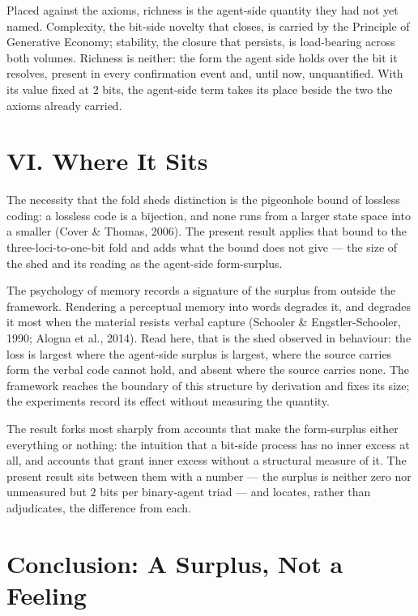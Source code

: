 \documentclass[11pt,oneside]{report}
\theoremstyle{definition}
\theoremstyle{remark}
\begin{document}
Placed against the axioms, richness is the agent-side quantity they had not yet named.
Complexity, the bit-side novelty that closes, is carried by the Principle of Generative Economy;
stability, the closure that persists, is load-bearing across both volumes. Richness is neither:
the form the agent side holds over the bit it resolves, present in every confirmation event and,
until now, unquantified. With its value fixed at \ensuremath{2} bits, the agent-side term takes
its place beside the two the axioms already carried.

\section*{VI. Where It Sits}

The necessity that the fold sheds distinction is the pigeonhole bound of lossless coding: a
lossless code is a bijection, and none runs from a larger state space into a smaller (Cover \&
Thomas, 2006). The present result applies that bound to the three-loci-to-one-bit fold and adds
what the bound does not give --- the size of the shed and its reading as the agent-side
form-surplus.

The psychology of memory records a signature of the surplus from outside the framework.
Rendering a perceptual memory into words degrades it, and degrades it most when the material
resists verbal capture (Schooler \& Engstler-Schooler, 1990; Alogna et al., 2014). Read here,
that is the shed observed in behaviour: the loss is largest where the agent-side surplus is
largest, where the source carries form the verbal code cannot hold, and absent where the source
carries none. The framework reaches the boundary of this structure by derivation and fixes its
size; the experiments record its effect without measuring the quantity.

The result forks most sharply from accounts that make the form-surplus either everything or
nothing: the intuition that a bit-side process has no inner excess at all, and accounts that
grant inner excess without a structural measure of it. The present result sits between them with
a number --- the surplus is neither zero nor unmeasured but \ensuremath{2} bits per binary-agent
triad --- and locates, rather than adjudicates, the difference from each.

\section*{Conclusion: A Surplus, Not a Feeling}
\end{document}
